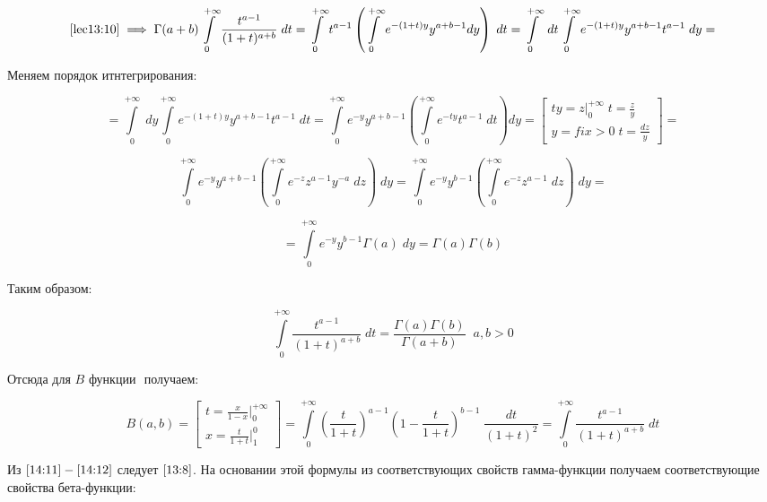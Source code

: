 \documentclass[../../main.tex]{subfiles}
\begin{document}
\[ \eqref{lec13:10} \implies \Gamma (a+b) \int\limits_{0}^{+\infty} \frac{ t^{a-1} }{ (1+t)^{a+b} } \; dt = \int\limits_{0}^{+\infty} t^{a-1} \left(  \int\limits_{0}^{+\infty} e^{-(1+t)y } y^{a+b-1} dy \right) \; dt =  \int\limits_{0}^{+\infty} \; dt  \int\limits_{0}^{+\infty} e^{ -(1+t)y } y^{a+b-1}  t^{a-1} \; dy = \]

Меняем порядок итнтегрирования:

\[ =  \int\limits_{0}^{+\infty} \; dy \int\limits_{0}^{+\infty} e^{ -(1+t)y } y^{a+b-1} t^{a-1} \; dt  = \int\limits_{0}^{+\infty} e^{-y} y^{a+b-1} \left( \int\limits_{0}^{+\infty} e^{-ty} t^{a-1} \; dt \right) dy = \left[  \begin{gathered}
									ty = z \bigg|_{0}^{+\infty} \; t = \frac{z}{y}\\
									y = fix > 0 \; t = \frac{dz}{y} 
										\end{gathered} \right] =   \]

\[  \int\limits_{0}^{+\infty} e^{-y} y^{a+b-1} \left( \int\limits_{0}^{+\infty} e^{-z} z^{a-1} y^{-a}  \; dz   \right) \; dy = \int\limits_{0}^{+\infty} e^{-y} y^{b-1} \left( \int\limits_{0}^{+\infty} e^{-z} z^{a-1}  \; dz \right) \; dy  =  \]


\[ = \int\limits_{0}^{+\infty} e^{-y} y^{b-1} \Gamma(a) \; dy = \Gamma(a) \Gamma(b)  \]

Таким образом:

\begin{equation}
	\label{14:11}
	\int\limits_{0}^{+\infty} \frac{ t^{a-1} }{ (1+t)^{a+b} } \; dt = \frac{\Gamma(a) \Gamma(b)}{\Gamma(a+b)} \; \; a,b > 0
\end{equation}

Отсюда для $B$ функции $\label{13:6}$ получаем: 

\begin{equation}
\label{14:12}
   B(a,b) = \left[  \begin{gathered}
t = \frac{x}{1-x} \bigg|_{0}^{+\infty}\\
x = \frac{t}{1+t}  \bigg|_{1}^{0} 
\end{gathered}   \right]   = \int\limits_{0}^{+\infty} \left(  \frac{t}{1+t} \right)^{a-1} \left(1 - \frac{t}{1+t} \right)^{b-1} \; \frac{dt}{\left( 1+t \right)^2} = \int\limits_{0}^{+\infty} \frac{t^{a-1}}{\left( 1+t \right)^{a+b}} \; dt  
\end{equation}

Из  $\eqref{14:11} - \eqref{14:12}$ следует $\eqref{13:8}$. На основании этой формулы из соответствующих свойств гамма-функции получаем соответствующие свойства бета-функции:
\end{document}
